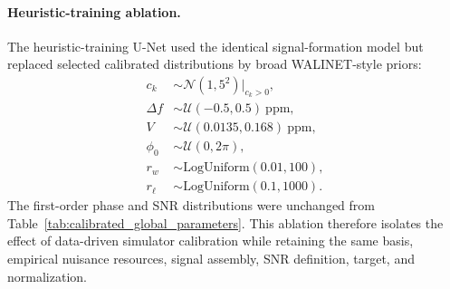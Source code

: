 \paragraph{Heuristic-training ablation.}
The heuristic-training U-Net used the identical signal-formation model but
replaced selected calibrated distributions by broad WALINET-style priors:
\begin{align}
    c_k &\sim \mathcal{N}(1,5^2)\big|_{c_k>0},\\
    \Delta f &\sim\mathcal{U}(-0.5,0.5)\ \mathrm{ppm},\\
    V &\sim\mathcal{U}(0.0135,0.168)\ \mathrm{ppm},\\
    \phi_0 &\sim\mathcal{U}(0,2\pi),\\
    r_w &\sim\mathrm{LogUniform}(0.01,100),\\
    r_\ell &\sim\mathrm{LogUniform}(0.1,1000).
\end{align}
The first-order phase and SNR distributions were unchanged from
Table~\ref{tab:calibrated_global_parameters}.  This ablation therefore isolates
the effect of data-driven simulator calibration while retaining the same basis,
empirical nuisance resources, signal assembly, SNR definition, target, and
normalization.

